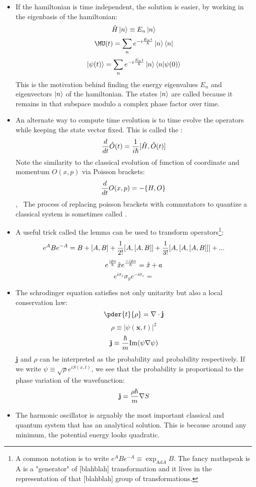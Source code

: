 \documentclass[10pt]{scrartcl}
\begin{document}
\begin{itemize}
	\item If the hamiltonian is time independent, the solution is easier, by working in the eigenbasis of the hamiltonian:
	\[\hat{H} \ket{n} \equiv E_n \ket{n} \]
	\[\MU(t) = \sum_n e^{-i {E_n t \over \hbar}} \ket{n} \bra{n} \]
	\[\ket{\psi(t)} = \sum_n e^{-i {E_n t \over \hbar}} \ket{n} \braket{n| \psi(0)}\]
	This is the motivation behind finding the energy eigenvalues $E_n$ and eigenvectors $\ket{n}$ of the hamiltonian.  The states $\ket{n}$ are called  because it remains in that subspace modulo a complex phase factor over time.
	\item An alternate way to compute time evolution is to time evolve the operators while keeping the state vector fixed.  This is called the :
	\[{d \over dt} \hat{O} (t)= {1 \over i \hbar} [\hat{H}, \hat{O}(t)] \]
	Note the similarity to the classical evolution of function of coordinate and momentum $O(x, p)$ via Poisson brackets:
	\[{d \over dt} O(x, p) = - \{H, O\}\], \
	The process of replacing poisson brackets with commutators to quantize a classical system is sometimes called .
	\item A useful trick called the \vocab{Baker-Campbell-Haussdorf (BCH)} lemma can be used to transform operators\footnote{A common notation is to write $e^{A} B e^{-A} \equiv \exp_{\text{Ad} A}  B$. The fancy mathspeak is A is a "generator" of [blahblah] transformation and it lives in the  representation of that [blahblah] group of transformations.}:
	\[e^A B e^{-A} = B + [A, B] + {1 \over 2!} [A, [A, B]] + {1 \over 3!}[A, [A, [A, B]]] + ... \]
	\[e^{i \hat{p}a \over \hbar} \hat{x} e^{- i \hat{p} a \over \hbar} = \hat{x} + a \]
	\[e^{i \sigma_x} \sigma_y e^{- i \sigma_x} = \]
	\item The schrodinger equation satisfies not only unitarity but also a local conservation law:
	\[ \pder{t}{\rho} = \nabla \cdot \mathbf{j} \]
	\[\rho \equiv |\psi(\mathbf{x}, t)|^2 \]
	\[\mathbf{j} \equiv {\hbar \over m} \mathrm{Im} (\psi \nabla \psi)\]
	$\mathbf{j}$ and $\rho$ can be interpreted as the probability  and probability  respectively.  If we write $\psi \equiv \sqrt{\rho} e^{i S(x, t) }$, we see that the probability  is proportional to the phase variation of the wavefunction:
	\[\mathbf{j}  = {\rho \hbar \over m} \nabla S \]
	\item The harmonic oscillator is arguably the most important classical and quantum system that has an analytical solution. This is because around any minimum, the potential energy looks quadratic.

\end{itemize}
\end{document}
